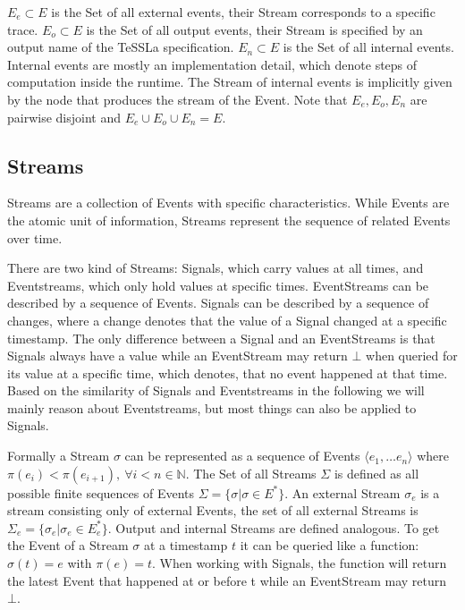 \(E_e \subset E\) is the Set of all external events, their Stream corresponds to a specific trace.
\(E_o \subset E\) is the Set of all output events, their Stream is specified by an output name of the TeSSLa specification.
\(E_n \subset E\) is the Set of all internal events.
Internal events are mostly an implementation detail, which denote steps of computation inside the runtime.
The Stream of internal events is implicitly given by the node that produces the stream of the Event.
Note that \(E_e, E_o, E_n\) are pairwise disjoint and \(E_e \cup E_o \cup E_n = E\).

\subsection{Streams}
\label{sec:concepts:defs:streams}

Streams are a collection of Events with specific characteristics.
While Events are the atomic unit of information, Streams represent the sequence of related Events over time.

There are two kind of Streams: Signals, which carry values at all times, and Event\-streams, which only hold values at specific times.
EventStreams can be described by a sequence of Events.
Signals can be described by a sequence of changes, where a change denotes that the value of a Signal changed at a specific timestamp.
The only difference between a Signal and an EventStreams is that Signals always have a value while an EventStream may return \(\bot\) when queried for its value at a specific time, which denotes, that no event happened at that time.
Based on the similarity of Signals and Eventstreams in the following we will mainly reason about Eventstreams, but most things can also be applied to Signals.

Formally a Stream \(\sigma\) can be represented as a sequence of Events \(\langle e_1, \dots e_n\rangle\) where \(\pi(e_i) < \pi(e_{i+1}),\ \forall i < n \in \mathbb{N}\).
The Set of all Streams \(\Sigma\) is defined as all possible finite sequences of Events \(\Sigma = \{\sigma | \sigma \in E^* \}\).
An external Stream \(\sigma_e\) is a stream consisting only of external Events, the set of all external Streams is \(\Sigma_e = \{\sigma_e | \sigma_e \in E_e^*\}\).
Output and internal Streams are defined analogous.
To get the Event of a Stream \(\sigma\) at a timestamp \(t\) it can be queried like a function: \(\sigma(t) = e\) with \(\pi(e) = t \).
When working with Signals, the function will return the latest Event that happened at or before t while an EventStream may return \(\bot\).

